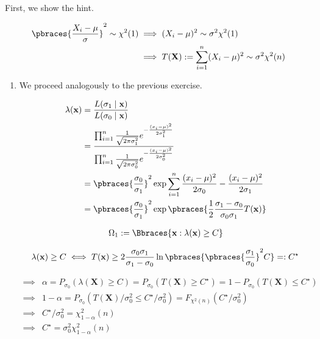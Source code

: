 \begin{solution}

First, we show the hint.

\begin{align*}
    \pbraces{\frac{X_i - \mu}{\sigma}}^2 \sim \chi^2(1)
    & \implies
    (X_i - \mu)^2 \sim \sigma^2 \chi^2(1) \\
    & \implies
    T(\mathbf X) := \sum_{i=1}^n (X_i - \mu)^2 \sim \sigma^2 \chi^2(n)
\end{align*}

\begin{enumerate}[label = (\alph*)]

    \item We proceed analogously to the previous exercise.
    
    \begin{align*}
        \lambda(\mathbf x)
        & =
        \frac
        {
            L(\sigma_1 \mid \mathbf x)
        }{
            L(\sigma_0 \mid \mathbf x)
        } \\
        & =
        \frac
        {
            \prod_{i=1}^n
                \frac{1}{\sqrt{2 \pi \sigma_1^2}}
                e^{-\frac{(x_i - \mu)^2}{2 \sigma_1^2}}
        }{
            \prod_{i=1}^n
                \frac{1}{\sqrt{2 \pi \sigma_0^2}}
                e^{-\frac{(x_i - \mu)^2}{2 \sigma_0^2}}
        } \\
        & =
        \pbraces{\frac{\sigma_0}{\sigma_1}}^2
        \exp \sum_{i=1}^n \frac{(x_i - \mu)^2}{2 \sigma_0} - \frac{(x_i - \mu)^2}{2 \sigma_1} \\
        & =
        \pbraces{\frac{\sigma_0}{\sigma_1}}^2
        \exp \pbraces{\frac{1}{2} \frac{\sigma_1 - \sigma_0}{\sigma_0 \sigma_1} T(\mathbf x)}
    \end{align*}

    \begin{align*}
        \Omega_1
        :=
        \Bbraces{\mathbf x: \lambda(\mathbf x) \geq C}
    \end{align*}

    \begin{align*}
        \lambda(\mathbf x) \geq C
        \iff
        T(\mathbf x) \geq 2 \frac{\sigma_0 \sigma_1}{\sigma_1 - \sigma_0} \ln \pbraces{\pbraces{\frac{\sigma_1}{\sigma_0}}^2 C} =: C^\star
    \end{align*}

    \begin{align*}
        \implies &
        \alpha = P_{\sigma_0}(\lambda(\mathbf X) \geq C) = P_{\sigma_0}(T(\mathbf X) \geq C^\star) = 1 - P_{\sigma_0}(T(\mathbf X) \leq C^\star) \\
        \implies &
        1 - \alpha = P_{\sigma_0}(T(\mathbf X) / \sigma_0^2 \leq C^\star / \sigma_0^2) = F_{\chi^2(n)}(C^\star / \sigma_0^2) \\
        \implies &
        C^\star / \sigma_0^2 = \chi_{1 - \alpha}^2(n) \\
        \implies &
        C^\star = \sigma_0^2 \chi_{1 - \alpha}^2(n)
    \end{align*}


\end{enumerate}
\end{solution}
